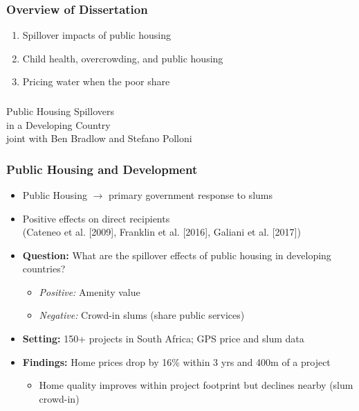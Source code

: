 \documentclass[aspectratio=149]{beamer}
\begin{document}
\begin{frame}
\frametitle{Overview of Dissertation}

\begin{enumerate}
\item Spillover impacts of public housing
\item Child health, overcrowding, and public housing
\item Pricing water when the poor share
\end{enumerate}
\end{frame}





\begin{frame}
\frametitle{}
\centering
{\Large \color{darkred} Public Housing Spillovers \\ in a Developing Country } \\
\vspace{.4cm}
joint with Ben Bradlow and Stefano Polloni
\end{frame}



\begin{frame}
\frametitle{Public Housing and Development}


\begin{itemize}
  \item Public Housing $\rightarrow$ primary government response to slums
  \vspace{.1cm}
  \item Positive effects on direct recipients \\ 
  {\footnotesize (Cateneo et al. [2009], Franklin et al. [2016], Galiani et al. [2017])}
  \vspace{.1cm}
  \item \textbf{Question:}  What are the spillover effects of public housing in developing countries?
      \begin{itemize}
      \item \textit{Positive:} Amenity value
      \item \textit{Negative:} Crowd-in slums (share public services)
    \end{itemize}
  \vspace{.1cm}
  \item \textbf{Setting:} 150+ projects in South Africa; GPS price and slum data
  \vspace{.1cm}
  \item \textbf{Findings:} Home prices drop by 16\% within 3 yrs and 400m of a project
    \begin{itemize}
      \item Home quality improves within project footprint but declines nearby (slum crowd-in)
    \end{itemize}
\end{itemize}
\end{frame}
\end{document}
